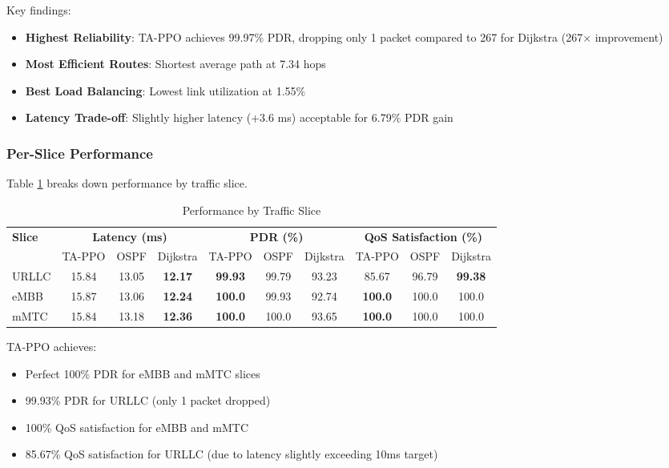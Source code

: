 Key findings:

\begin{itemize}
\item \textbf{Highest Reliability}: TA-PPO achieves 99.97\% PDR, dropping only 1 packet compared to 267 for Dijkstra (267$\times$ improvement)
\item \textbf{Most Efficient Routes}: Shortest average path at 7.34 hops
\item \textbf{Best Load Balancing}: Lowest link utilization at 1.55\%
\item \textbf{Latency Trade-off}: Slightly higher latency (+3.6 ms) acceptable for 6.79\% PDR gain
\end{itemize}

\subsubsection{Per-Slice Performance}

Table \ref{tab:slice_results} breaks down performance by traffic slice.

\begin{table}[t]
\centering
\caption{Performance by Traffic Slice}
\label{tab:slice_results}
\begin{tabular}{|l|c|c|c|c|c|c|c|c|c|}
\hline
\multirow{2}{*}{\textbf{Slice}} & \multicolumn{3}{c|}{\textbf{Latency (ms)}} & \multicolumn{3}{c|}{\textbf{PDR (\%)}} & \multicolumn{3}{c|}{\textbf{QoS Satisfaction (\%)}} \\
\cline{2-10}
 & TA-PPO & OSPF & Dijkstra & TA-PPO & OSPF & Dijkstra & TA-PPO & OSPF & Dijkstra \\
\hline
\hline
URLLC & 15.84 & 13.05 & \textbf{12.17} & \textbf{99.93} & 99.79 & 93.23 & 85.67 & 96.79 & \textbf{99.38} \\
eMBB  & 15.87 & 13.06 & \textbf{12.24} & \textbf{100.0} & 99.93 & 92.74 & \textbf{100.0} & 100.0 & 100.0 \\
mMTC  & 15.84 & 13.18 & \textbf{12.36} & \textbf{100.0} & 100.0 & 93.65 & \textbf{100.0} & 100.0 & 100.0 \\
\hline
\end{tabular}
\end{table}

TA-PPO achieves:
\begin{itemize}
\item Perfect 100\% PDR for eMBB and mMTC slices
\item 99.93\% PDR for URLLC (only 1 packet dropped)
\item 100\% QoS satisfaction for eMBB and mMTC
\item 85.67\% QoS satisfaction for URLLC (due to latency slightly exceeding 10ms target)
\end{itemize}

